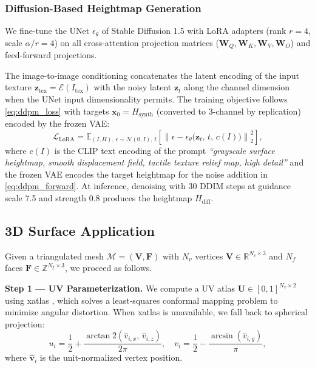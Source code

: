\documentclass[conference]{IEEEtran}
\newcommand{\R}{\mathbb{R}}
\newcommand{\norm}[1]{\left\lVert#1\right\rVert}
\begin{document}
\subsubsection{Diffusion-Based Heightmap Generation}

We fine-tune the UNet $\epsilon_\theta$ of Stable Diffusion 1.5 \cite{b7}
with LoRA adapters (rank $r=4$, scale $\alpha/r = 4$) on all
cross-attention projection matrices ($\mathbf{W}_Q, \mathbf{W}_K,
\mathbf{W}_V, \mathbf{W}_O$) and feed-forward projections.

The image-to-image conditioning concatenates the latent encoding of the
input texture $\mathbf{z}_{\text{tex}} = \mathcal{E}(I_{\text{tex}})$ with
the noisy latent $\mathbf{z}_t$ along the channel dimension when the UNet
input dimensionality permits. The training objective follows \eqref{eq:ddpm_loss}
with targets $\mathbf{x}_0 = H_{\text{synth}}$ (converted to 3-channel by
replication) encoded by the frozen VAE:
\begin{equation}
  \mathcal{L}_{\text{LoRA}} =
    \mathbb{E}_{(I,H),\,\epsilon \sim \mathcal{N}(0,I),\,t}\!
    \left[\norm{\epsilon -
      \epsilon_\theta\!\bigl(\mathbf{z}_t,\,t,\,c(I)\bigr)}_2^2\right],
  \label{eq:lora_loss}
\end{equation}
where $c(I)$ is the CLIP text encoding of the prompt
\emph{``grayscale surface heightmap, smooth displacement field, tactile
texture relief map, high detail''} and the frozen VAE encodes the
target heightmap for the noise addition in \eqref{eq:ddpm_forward}.
At inference, denoising with 30 DDIM steps at guidance scale 7.5 and
strength 0.8 produces the heightmap $H_{\text{diff}}$.

\subsection{3D Surface Application}
\label{sec:3d}

Given a triangulated mesh $\mathcal{M} = (\mathbf{V}, \mathbf{F})$ with
$N_v$ vertices $\mathbf{V} \in \R^{N_v \times 3}$ and $N_f$ faces
$\mathbf{F} \in \mathbb{Z}^{N_f \times 3}$, we proceed as follows.

\textbf{Step 1 — UV Parameterization.} We compute a UV atlas
$\mathbf{U} \in [0,1]^{N_v \times 2}$ using xatlas \cite{b9}, which solves
a least-squares conformal mapping problem to minimize angular distortion.
When xatlas is unavailable, we fall back to spherical projection:
\begin{equation}
  u_i = \frac{1}{2} + \frac{\arctan2(\hat{v}_{i,x},\,\hat{v}_{i,z})}{2\pi},
  \quad
  v_i = \frac{1}{2} - \frac{\arcsin(\hat{v}_{i,y})}{\pi},
  \label{eq:spherical_uv}
\end{equation}
where $\hat{\mathbf{v}}_i$ is the unit-normalized vertex position.
\end{document}
